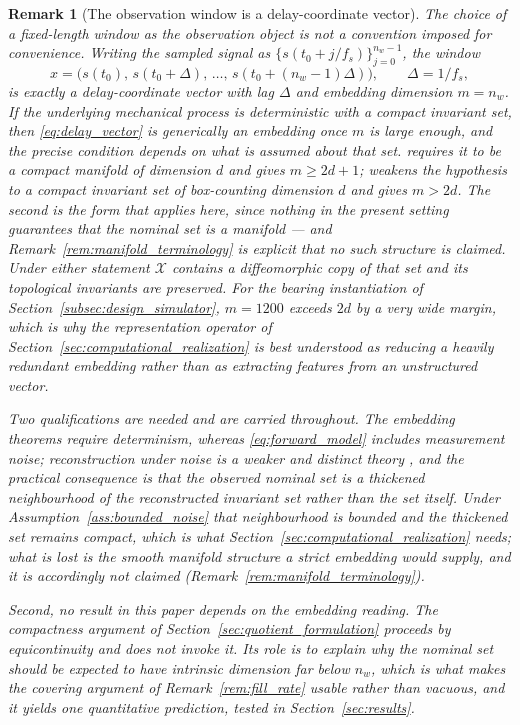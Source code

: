 \documentclass[a4paper]{cas-sc}
\newtheorem{remark}{Remark}
\newcommand{\X}{\ensuremath{\mathcal{X}}}
\begin{document}
\begin{remark}[The observation window is a delay-coordinate vector]
\label{rem:delay_embedding}
The choice of a fixed-length window as the observation object is not a
convention imposed for convenience. Writing the sampled signal as
\(\{s(t_0+j/f_s)\}_{j=0}^{n_w-1}\), the window
\begin{equation}
x = \bigl(s(t_0),\,s(t_0+\Delta),\,\ldots,\,s(t_0+(n_w-1)\Delta)\bigr),
\qquad \Delta = 1/f_s,
\label{eq:delay_vector}
\end{equation}
is exactly a delay-coordinate vector with lag \(\Delta\) and embedding
dimension \(m=n_w\). If the underlying mechanical process is deterministic
with a compact invariant set, then \eqref{eq:delay_vector} is generically an
embedding once \(m\) is large enough, and the precise condition depends on
what is assumed about that set. \citet{takens1981} requires it to be a
compact \emph{manifold} of dimension \(d\) and gives \(m\ge 2d+1\);
\citet{sauer1991} weakens the hypothesis to a compact invariant set of
box-counting dimension \(d\) and gives \(m>2d\). The second is the form that
applies here, since nothing in the present setting guarantees that the nominal
set is a manifold --- and Remark~\ref{rem:manifold_terminology} is explicit
that no such structure is claimed. Under either statement
\(\X\) contains a diffeomorphic copy of that set and its topological
invariants are preserved. For the bearing instantiation of
Section~\ref{subsec:design_simulator}, \(m=1200\) exceeds \(2d\) by a very
wide margin, which is why the representation operator of
Section~\ref{sec:computational_realization} is best understood as reducing a
heavily redundant embedding rather than as extracting features from an
unstructured vector.

Two qualifications are needed and are carried throughout. The embedding
theorems require determinism, whereas \eqref{eq:forward_model} includes
measurement noise; reconstruction under noise is a weaker and distinct theory
\citep{casdagli1991}, and the practical consequence is that the observed
nominal set is a thickened neighbourhood of the reconstructed invariant set
rather than the set itself. Under
Assumption~\ref{ass:bounded_noise} that neighbourhood is bounded and the
thickened set remains compact, which is what
Section~\ref{sec:computational_realization} needs; what is lost is the smooth
manifold structure a strict embedding would supply, and it is accordingly not
claimed (Remark~\ref{rem:manifold_terminology}).

Second, no result in this paper \emph{depends} on the embedding reading. The
compactness argument of Section~\ref{sec:quotient_formulation} proceeds by
equicontinuity and does not invoke it. Its role is to explain why the nominal
set should be expected to have intrinsic dimension far below \(n_w\), which is
what makes the covering argument of
Remark~\ref{rem:fill_rate} usable rather than vacuous, and it yields one
quantitative prediction, tested in Section~\ref{sec:results}.
\end{remark}
\end{document}
